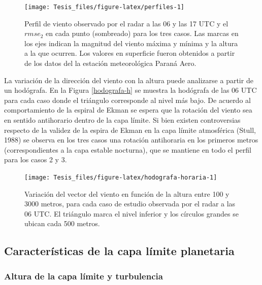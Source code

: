 \documentclass[12pt,spanish,oneside]{book}
\begin{document}
\begin{figure}

{\centering \texttt{[image: Tesis\_files/figure-latex/perfiles-1]} 

}

\caption{Perfil de viento observado por el radar a las 06 y las 17 UTC y el $rmse_2$ en cada punto (sombreado) para los tres casos. Las marcas en los ejes indican la magnitud del viento máxima y mínima y la altura a la que ocurren. Los valores en superficie fueron obtenidos a partir de los datos del la estación meteorológica Paraná Aero. \label{perfiles-horarios}}\label{fig:perfiles}
\end{figure}

La variación de la dirección del viento con la altura puede analizarse a
partir de un hodógrafa. En la Figura \ref{hodografa-h} se muestra la
hodógrafa de las 06 UTC para cada caso donde el triángulo corresponde al
nivel más bajo. De acuerdo al comportamiento de la espiral de Ekman se
espera que la rotación del viento sea en sentido antihorario dentro de
la capa límite. Si bien existen controversias respecto de la validez de
la espira de Ekman en la capa límite atmosférica (Stull, 1988) se
observa en los tres casos una rotación antihoraria en los primeros
metros (correspondientes a la capa estable nocturna), que se mantiene en
todo el perfil para los casos 2 y 3.

\begin{figure}

{\centering \texttt{[image: Tesis\_files/figure-latex/hodografa-horaria-1]} 

}

\caption{Variación del vector del viento en función de la altura entre 100 y 3000 metros, para cada caso de estudio observada por el radar a las 06 UTC. El triángulo marca el nivel inferior y los círculos grandes se ubican cada 500 metros. \label{hodografa-h}}\label{fig:hodografa-horaria}
\end{figure}

\subsection{Características de la capa límite
planetaria}\label{caracteristicas-de-la-capa-limite-planetaria}

\subsubsection{Altura de la capa límite y
turbulencia}\label{altura-de-la-capa-limite-y-turbulencia}
\end{document}
